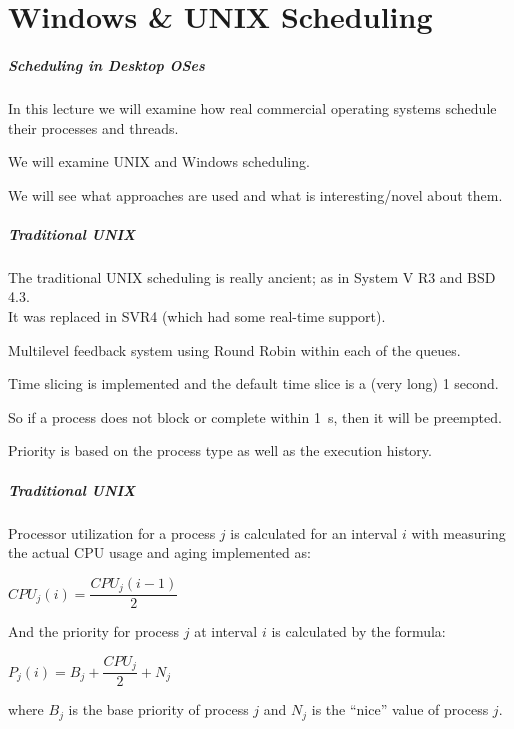 \part{Windows \& UNIX Scheduling}

\begin{frame}
\partpage
\end{frame}

\begin{frame}
\frametitle{Scheduling in Desktop OSes}

In this lecture we will examine how real commercial operating systems schedule their processes and threads. 

We will examine UNIX and Windows scheduling. 

We will see what approaches are used and what is interesting/novel about them.


\end{frame}

\begin{frame}
\frametitle{Traditional UNIX}

The traditional UNIX scheduling is really ancient; as in System V R3 and BSD 4.3.\\
\quad It was replaced in SVR4 (which had some real-time support).

Multilevel feedback system using Round Robin within each of the queues. 

Time slicing is implemented and the default time slice is a (very long) 1 second. 

So if a process does not block or complete within 1~s, then it will be preempted. 

Priority is based on the process type as well as the execution history.

\end{frame}

\begin{frame}
\frametitle{Traditional UNIX}

Processor utilization for a process $j$ is calculated for an interval $i$ with measuring the actual CPU usage and aging implemented as:

\begin{center}
$CPU_{j}(i) = \dfrac{CPU_{j}(i - 1)}{2}$
\end{center}

And the priority for process $j$ at interval $i$ is calculated by the formula:

\begin{center}
$P_{j}(i) = B_{j} + \dfrac{CPU_{j}}{2} + N_{j}$
\end{center}

where $B_{j}$ is the base priority of process $j$ and $N_{j}$ is the ``nice'' value of process $j$.


\end{frame}

